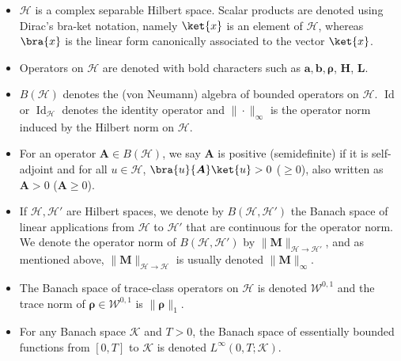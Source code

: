 \documentclass{article}
\newcommand{\xH}{\mathcal{H}}
\newcommand{\xK}{\mathcal{K}}
\newcommand{\xW}{\mathcal{W}}
\newcommand{\norm}[1]{\| #1 \|}
\let\bf\boldsymbol
\newcommand{\Id}{\operatorname{Id}}
\newcommand{\orho}{{\bf \rho}}
\newcommand{\oM}{{\bf M}}
\newcommand{\oa}{{\bf a}}
\newcommand{\ob}{{\bf b}}
\newcommand{\oL}{{\bf L}}
\newcommand{\oH}{{\bf H}}
\newcommand{\oA}{{\bf A}}
\begin{document}
\begin{itemize}
    \item $\xH$ is a complex separable Hilbert space. Scalar products are denoted using Dirac's bra-ket notation, namely $\ket{x}$ is an element of $\xH$, whereas $\bra{x}$ is the linear form canonically associated to the vector $\ket{x}$.
    \item Operators on $\xH$ are denoted with bold characters such as $\oa, \ob, \orho$, $\oH$, $\oL$.
    \item $B(\xH)$ denotes the (von Neumann) algebra of bounded operators on $\xH$.
    $\Id$ or $\Id_\xH$ denotes the identity operator and $\norm{ \cdot }_\infty$ is the operator norm induced by the Hilbert norm on $\xH$.
    
    \item For an operator $\oA\in B(\xH)$, we say $\oA$ is positive (semidefinite) if it is self-adjoint and for all $u \in \xH$, $\bra{u}\oA \ket{u}> 0$ ($\geq 0$), also written as $\oA>0$ ($\oA \geq 0$). 
    \item If $\xH,\xH'$ are Hilbert spaces, we denote by $B(\xH,\xH')$ the Banach space of linear applications from $\xH$ to $\xH'$ that are continuous for the operator norm. We denote the operator norm of $B(\xH,\xH')$ by $\|\oM\|_{\xH \to \xH'}$, and as mentioned above, $\|\oM\|_{\xH \to \xH}$ is usually denoted $\|\oM\|_\infty$.
    \item The Banach space of trace-class operators on $\xH$ is denoted $\xW^{0,1}$ and the trace norm of $\orho\in \xW^{0,1}$ is $\|\orho\|_1$. 
    \item For any Banach space $\xK$ and $T>0$, the Banach space of essentially bounded functions from $[0,T]$ to $\xK$ is denoted $L^\infty(0, T;\xK)$.
    

\end{itemize}
\end{document}
